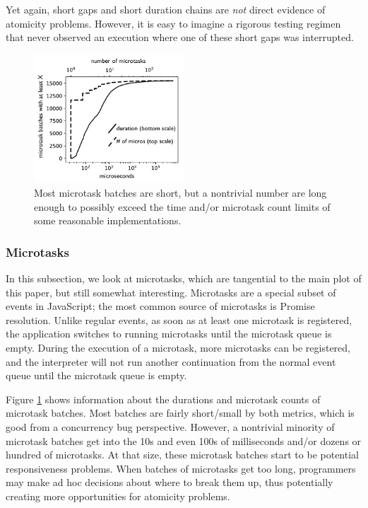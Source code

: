 \documentclass[acmsmall,anonymous,review]{acmart}\settopmatter{printfolios=true,printccs=false,printacmref=false}
\begin{document}
Yet again, short gaps and short duration chains are \emph{not} direct evidence of atomicity problems.
However, it is easy to imagine a rigorous testing regimen that never observed an execution where one of these short gaps was interrupted.

\begin{figure}
\hspace*{-0.2cm}\includegraphics[width=0.5\textwidth]{micros_graph_bw}
\caption{Most microtask batches are short, but a nontrivial number are long enough to possibly exceed the time and/or microtask count limits of some reasonable implementations.}
\label{fig:graph_microtasks}
\end{figure}

\subsubsection{Microtasks}

In this subsection, we look at microtasks, which are tangential to the main plot of this paper, but still somewhat interesting.
Microtasks are a special subset of events in JavaScript; the most common source of microtasks is Promise resolution.
Unlike regular events, as soon as at least one microtask is registered, the application switches to running microtasks until the microtask queue is empty.
During the execution of a microtask, more microtasks can be registered, and the interpreter will not run another continuation from the normal event queue until the microtask queue is empty.

Figure \ref{fig:graph_microtasks} shows information about the durations and microtask counts of microtask batches.
Most batches are fairly short/small by both metrics, which is good from a concurrency bug perspective.
However, a nontrivial minority of microtask batches get into the 10s and even 100s of milliseconds and/or dozens or hundred of microtasks.
At that size, these microtask batches start to be potential responsiveness problems.
When batches of microtasks get too long, programmers may make ad hoc decisions about where to break them up, thus potentially creating more opportunities for atomicity problems.
\end{document}
